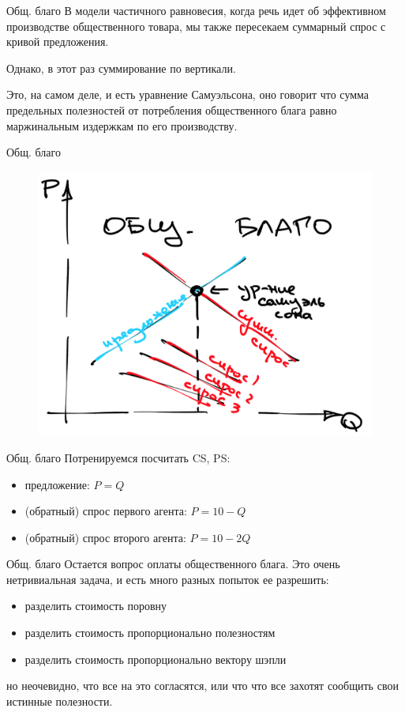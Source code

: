\documentclass{beamer}
\begin{document}
\begin{frame}{Общ. благо}
В модели частичного равновесия, когда речь идет об эффективном производстве \alert{общественного товара}, мы также пересекаем суммарный спрос с кривой предложения.

Однако, в этот раз \alert{суммирование по вертикали}.

Это, на самом деле, и есть уравнение Самуэльсона, оно говорит что сумма предельных полезностей от потребления общественного блага равно маржинальным издержкам по его производству.
\end{frame}

\begin{frame}{Общ. благо}
\begin{figure}[hbt]
\centering
\includegraphics[width=.9 \textwidth]{public.png}
\end{figure}
\end{frame}

\begin{frame}{Общ. благо}
Потренируемся посчитать CS, PS:

\begin{itemize}
  \item предложение: $P = Q$
  \item (обратный) спрос первого агента: $P = 10 - Q$ 
  \item (обратный) спрос второго агента: $P = 10 - 2Q$ 
\end{itemize}
\end{frame}

\begin{frame}{Общ. благо}
Остается вопрос оплаты общественного блага. Это очень нетривиальная задача, и есть много разных попыток ее разрешить:
\begin{itemize}
  \item разделить стоимость поровну
  \item разделить стоимость пропорционально полезностям
  \item разделить стоимость пропорционально вектору шэпли
\end{itemize}
но неочевидно, что все на это согласятся, или что что все захотят сообщить свои истинные полезности.
\end{frame}
\end{document}
